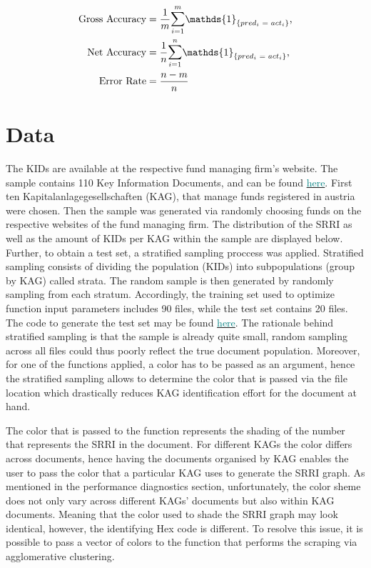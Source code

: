 \documentclass[aodsor,preprint]{imsart}
\numberwithin{equation}{section}
\theoremstyle{plain}
\begin{document}
\begin{align*}
\text{Gross Accuracy} &= \frac{1}{m}\mathlarger{\sum}_{i = 1}^m\mathds{1}_{\{pred_i \text{ }= \text{ } act_i\}}\text{,} \\
\text{Net Accuracy} &=  \frac{1}{n}\mathlarger{\sum}_{i = 1}^n\mathds{1}_{\{pred_i \text{ }= \text{ } act_i\}}\text{,} \\
\text{Error Rate} &= \frac{n - m}{n}
\end{align*}

\section{Data}
The KIDs are available at the respective fund managing firm's website. The  sample contains 110 Key Information Documents, and can be found \href{https://github.com/Base-R-Best-R/KID/tree/main/KIDs}{\textcolor{teal}{here}}. First ten Kapitalanlagegesellschaften (KAG), that manage funds registered in austria were chosen. Then the sample was generated via randomly choosing funds on the respective websites of the fund managing firm. The distribution of the SRRI as well as the amount of KIDs per KAG within the sample are displayed below. Further, to obtain a test set, a stratified sampling proccess was applied. Stratified sampling consists of dividing the population (KIDs) into subpopulations (group by KAG) called strata. The random sample is then generated by randomly sampling from each stratum.  Accordingly, the training set used to optimize function input parameters includes 90 files, while the test set contains 20 files. The code to generate the test set may be found \href{https://github.com/Base-R-Best-R/KID/blob/main/Code/Package/DEV/Generate_Test_Sample.R}{\textcolor{teal}{here}}. The rationale behind stratified sampling is that the sample is already quite small, random sampling across all files could thus poorly reflect the true document population. Moreover, for one of the functions applied, a color has to be passed as an argument, hence the stratified sampling allows to determine the color that is passed via the file location which drastically reduces KAG identification effort for the document at hand. 

The color that is passed to the function represents the shading of the number that represents the SRRI in the document. For different KAGs the color differs across documents, hence having the documents organised by KAG enables the user to pass the color that a particular KAG uses to generate the SRRI graph. As mentioned in the performance diagnostics section, unfortunately, the color sheme does not only vary across different KAGs' documents but also within KAG documents. Meaning that the color used to shade the SRRI graph may look identical, however, the identifying Hex code is different. To resolve this issue, it is possible to pass a vector of colors to the function that performs the scraping via agglomerative clustering. 
\end{document}

